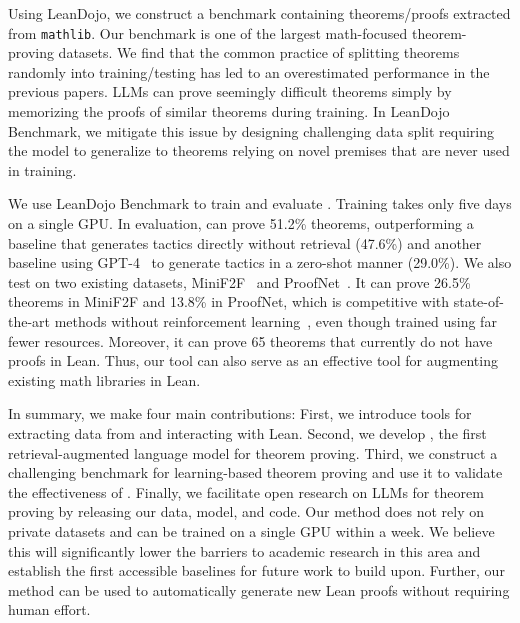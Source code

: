  Using LeanDojo, we construct a benchmark containing {\numproofs} theorems/proofs extracted from \texttt{mathlib}. Our benchmark is one of the largest math-focused theorem-proving datasets. We find that the common practice of splitting theorems randomly into training/testing has led to an overestimated performance in the previous papers. LLMs can prove seemingly difficult theorems simply by memorizing the proofs of similar theorems during training. In LeanDojo Benchmark, we mitigate this issue by designing challenging data split requiring the model to generalize to theorems relying on novel premises that are never used in training.

We use LeanDojo Benchmark to train and evaluate {\name}. Training takes only five days on a single GPU. In evaluation, {\name} can prove 51.2\% theorems, outperforming a baseline that generates tactics directly without retrieval (47.6\%) and another baseline using GPT-4~\cite{openai2023gpt4} to generate tactics in a zero-shot manner (29.0\%). We also test {\name} on two existing datasets, MiniF2F~\cite{zheng2022minif2f} and ProofNet~\cite{azerbayev2023proofnet}. It can prove 26.5\% theorems in MiniF2F and 13.8\% in ProofNet, which is competitive with state-of-the-art methods without reinforcement learning~\cite{polu2023formal}, even though trained using far fewer resources. Moreover, it can prove 65 theorems that currently do not have proofs in Lean. Thus, our tool can also serve as an effective tool for augmenting existing math libraries in Lean.


In summary, we make four main contributions: First, we introduce tools for extracting data from and interacting with Lean. Second, we develop {\name}, the first retrieval-augmented language model for theorem proving. Third, we construct a challenging benchmark for learning-based theorem proving and use it to validate the effectiveness of {\name}. Finally, we facilitate open research on LLMs for theorem proving by releasing our data, model, and code. Our method does not rely on private datasets and can be trained on a single GPU within a week. We believe this will significantly lower the barriers to academic research in this area and establish the first accessible baselines for future work to build upon. Further, our method can be used to automatically generate new Lean proofs without requiring human effort.